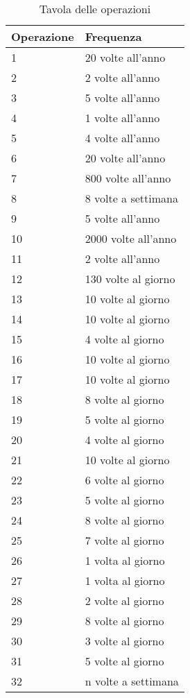 \documentclass{article}
\begin{document}
\begin{table}
\centering
\begin{tabularx}{\textwidth}{|X|X|}
\hline 
\textbf{Operazione} & \textbf{Frequenza} \\ \hline
1 & 20 volte all'anno \\ \hline
2 & 2 volte all'anno \\ \hline
3 & 5 volte all'anno \\ \hline
4 & 1 volte all'anno \\ \hline
5 & 4 volte all'anno \\ \hline
6 & 20 volte all'anno \\ \hline
7 & 800 volte all'anno \\ \hline
8 & 8 volte a settimana \\ \hline
9 & 5 volte all'anno \\ \hline
10 & 2000 volte all'anno \\ \hline
11 & 2 volte all'anno \\ \hline
12 & 130 volte al giorno \\ \hline
13 & 10 volte al giorno \\ \hline
14 & 10 volte al giorno \\ \hline
15 & 4 volte al giorno \\ \hline
16 & 10 volte al giorno \\ \hline
17 & 10 volte al giorno \\ \hline
18 & 8 volte al giorno \\ \hline
19 & 5 volte al giorno \\ \hline
20 & 4 volte al giorno \\ \hline
21 & 10 volte al giorno \\ \hline
22 & 6 volte al giorno \\ \hline
23 & 5 volte al giorno \\ \hline
24 & 8 volte al giorno \\ \hline
25 & 7 volte al giorno \\ \hline
26 & 1 volta al giorno \\ \hline
27 & 1 volta al giorno \\ \hline
28 & 2 volte al giorno \\ \hline
29 & 8 volte al giorno \\ \hline
30 & 3 volte al giorno \\ \hline
31 & 5 volte al giorno \\ \hline
32 & n volte a settimana \\ \hline
\end{tabularx}
\caption{Tavola delle operazioni}
\label{table_operazioni}
\end{table}
\end{document}

